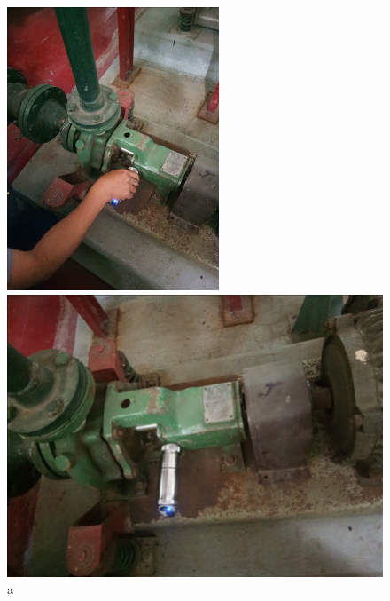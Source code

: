 \begin{figure}[ht]
	\begin{minipage}[b]{0.225\linewidth}
		\centering
		\includegraphics[width=\textwidth]{figures/fig_ch02_vib2}
		\caption{a}
	\end{minipage}
	\hspace{0.05cm}
	\begin{minipage}[b]{0.225\linewidth}
		\centering
		\includegraphics[width=\textwidth]{figures/fig_ch02_vib3}

\end{minipage}
\end{figure}
